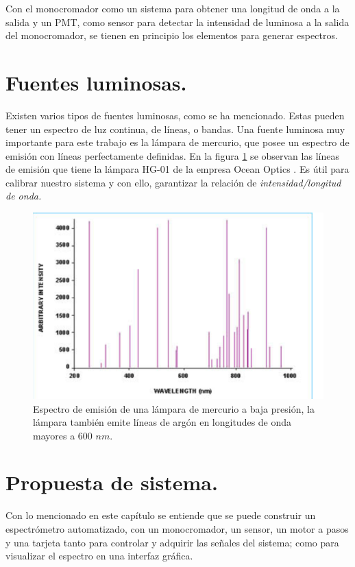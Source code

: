 Con el monocromador como un sistema para obtener una longitud de onda a la salida y un PMT, como sensor para detectar la intensidad de luminosa a la salida del monocromador, se tienen en principio los elementos para generar espectros.

\section{Fuentes luminosas.}
Existen varios tipos de fuentes luminosas, como se ha mencionado. Estas pueden tener un espectro de luz continua, de líneas, o bandas. Una fuente luminosa muy importante para este trabajo es la lámpara de mercurio, que posee un espectro de emisión con líneas perfectamente definidas. En la figura \ref{fig:lamparamercurio} se observan las líneas de emisión que tiene la lámpara HG-01 de la empresa Ocean Optics \cite{Excel2000}. Es útil para calibrar nuestro sistema y con ello, garantizar la relación de \textit{intensidad/longitud de onda.}
\begin{figure}[h]
	\centering
	\includegraphics[width=0.7\linewidth]{Imagenes/lamparaMercurio}
	\caption[Espectro de emisión de una lámpara de mercurio a baja presión.]{Espectro de emisión de una lámpara de mercurio a baja presión, la lámpara también emite líneas de argón en longitudes de onda mayores a 600 $nm$. \cite{Excel2000}}
	\label{fig:lamparamercurio}
\end{figure}
\section{Propuesta de sistema.}
Con lo mencionado en este capítulo se entiende que se puede construir un espectrómetro automatizado, con un monocromador, un sensor, un motor a pasos y una tarjeta tanto para controlar y adquirir las señales del sistema; como para visualizar el espectro en una interfaz gráfica. 
